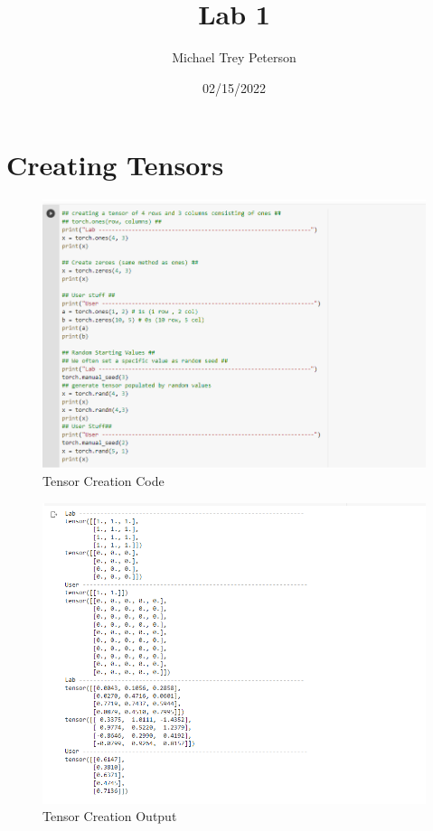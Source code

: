 \documentclass[24pt, letterpaper]{article}
\title{Lab 1}
\author{Michael Trey Peterson}
\date{02/15/2022}
\begin{document}
\maketitle
\tableofcontents
	\section{Creating Tensors}
		\begin{figure}[ht]
			\centering
			\includegraphics[width=0.7\linewidth]{Lab1Img/CTensor_Code}
			\caption{Tensor Creation Code}
			\label{fig:ctensorcode}
		\end{figure}
		\begin{figure}[ht]
			\centering
			\includegraphics[width=0.7\linewidth]{Lab1Img/CTensor_Result}
			\caption{Tensor Creation Output}
			\label{fig:ctensorresult}
		\end{figure}			
		\FloatBarrier
		
\end{document}
